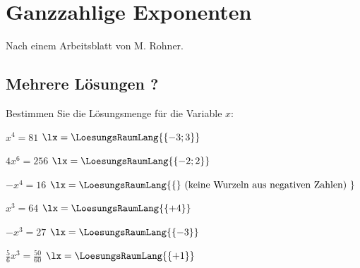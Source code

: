 


\usepackage{amssymb} %
\renewcommand{\metaHeaderLine}{Potenzgleichungen}
\renewcommand{\arbeitsblattTitel}{(BMS)}

\arbeitsblattHeader{}


\section{Ganzzahlige Exponenten}
\small{Nach einem Arbeitsblatt von M. Rohner.}


\subsection{Mehrere Lösungen ?}
Bestimmen Sie die Lösungsmenge für die Variable $x$:


\begin{bbwAufgabenBlock}

\item $x^4=81$ \hspace{10mm} $\lx = \LoesungsRaumLang{\{-3; 3\}}$

\item
 $4x^6=256$ \hspace{10mm} $\lx=\LoesungsRaumLang{\{-2; 2\}}$
 \noTRAINER{\newpage}

\item
 $-x^4=16$ \hspace{10mm} $\lx=\LoesungsRaumLang{\{\} \text{ (keine
 Wurzeln aus negativen Zahlen) }}$

\item
 $x^3=64$ \hspace{10mm} $\lx=\LoesungsRaumLang{\{+4\} }$

\item
 $-x^3=27$ \hspace{10mm} $\lx=\LoesungsRaumLang{\{-3\} }$
 \noTRAINER{\newpage}

\item
 $\frac56 x^3 = \frac{50}{60}$ \hspace{10mm} $\lx=\LoesungsRaumLang{\{+1\}  }$

\end{bbwAufgabenBlock}
\noTRAINER{\newpage}



